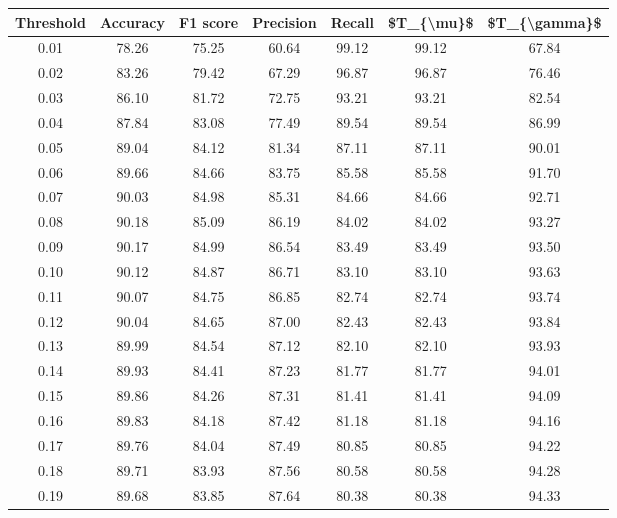 \begin{tabular}{|c|c|c|c|c|c|c|}
\toprule
 Threshold &  Accuracy &  F1 score &  Precision &  Recall &  \$T\_\{\textbackslash mu\}\$ &  \$T\_\{\textbackslash gamma\}\$ \\
\hline
      0.01 &     78.26 &     75.25 &      60.64 &   99.12 &      99.12 &         67.84 \\
      0.02 &     83.26 &     79.42 &      67.29 &   96.87 &      96.87 &         76.46 \\
      0.03 &     86.10 &     81.72 &      72.75 &   93.21 &      93.21 &         82.54 \\
      0.04 &     87.84 &     83.08 &      77.49 &   89.54 &      89.54 &         86.99 \\
      0.05 &     89.04 &     84.12 &      81.34 &   87.11 &      87.11 &         90.01 \\
      0.06 &     89.66 &     84.66 &      83.75 &   85.58 &      85.58 &         91.70 \\
      0.07 &     90.03 &     84.98 &      85.31 &   84.66 &      84.66 &         92.71 \\
      0.08 &     90.18 &     85.09 &      86.19 &   84.02 &      84.02 &         93.27 \\
      0.09 &     90.17 &     84.99 &      86.54 &   83.49 &      83.49 &         93.50 \\
      0.10 &     90.12 &     84.87 &      86.71 &   83.10 &      83.10 &         93.63 \\
      0.11 &     90.07 &     84.75 &      86.85 &   82.74 &      82.74 &         93.74 \\
      0.12 &     90.04 &     84.65 &      87.00 &   82.43 &      82.43 &         93.84 \\
      0.13 &     89.99 &     84.54 &      87.12 &   82.10 &      82.10 &         93.93 \\
      0.14 &     89.93 &     84.41 &      87.23 &   81.77 &      81.77 &         94.01 \\
      0.15 &     89.86 &     84.26 &      87.31 &   81.41 &      81.41 &         94.09 \\
      0.16 &     89.83 &     84.18 &      87.42 &   81.18 &      81.18 &         94.16 \\
      0.17 &     89.76 &     84.04 &      87.49 &   80.85 &      80.85 &         94.22 \\
      0.18 &     89.71 &     83.93 &      87.56 &   80.58 &      80.58 &         94.28 \\
      0.19 &     89.68 &     83.85 &      87.64 &   80.38 &      80.38 &         94.33 \\

\end{tabular}
